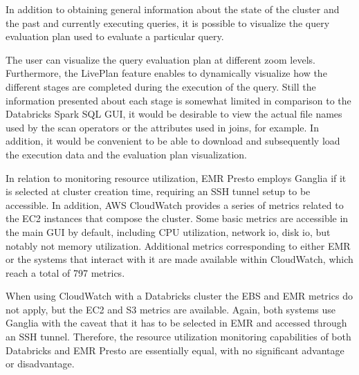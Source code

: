 In addition to obtaining general information about the state of the cluster and the past and currently executing queries, it is possible to visualize the query evaluation plan used to evaluate a particular query.

The user can visualize the query evaluation plan at different zoom levels. Furthermore, the LivePlan feature enables to dynamically visualize how the different stages are completed during the execution of the query. Still the information presented about each stage is somewhat limited in comparison to the Databricks Spark SQL GUI, it would be desirable to view the actual file names used by the scan operators or the attributes used in joins, for example. In addition, it would be convenient to be able to download and subsequently load the execution data and the evaluation plan visualization.

In relation to monitoring resource utilization, EMR Presto employs Ganglia if it is selected at cluster creation time, requiring an SSH tunnel setup to be accessible. In addition, AWS CloudWatch provides a series of metrics related to the EC2 instances that compose the cluster. Some basic metrics are accessible in the main GUI by default, including CPU utilization, network io, disk io, but notably not memory utilization. Additional metrics corresponding to either EMR or the systems that interact with it are made available within CloudWatch, which reach a total of 797 metrics.

When using CloudWatch with a Databricks cluster the EBS and EMR metrics do not apply, but the EC2 and S3 metrics are available. Again, both systems use Ganglia with the caveat that it has to be selected in EMR and accessed through an SSH tunnel. Therefore, the resource utilization monitoring capabilities of both Databricks and EMR Presto are essentially equal, with no significant advantage or disadvantage.

